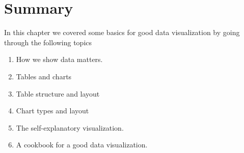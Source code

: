 \documentclass[
]{book}
\providecommand{\tightlist}{%
  \setlength{\itemsep}{0pt}\setlength{\parskip}{0pt}}
\begin{document}
\hypertarget{summary-3}{%
\section{Summary}\label{summary-3}}

In this chapter we covered some basics for good data visualization by going through the following topics

\begin{enumerate}
\def\labelenumi{\arabic{enumi}.}
\tightlist
\item
  How we show data matters.
\item
  Tables and charts
\item
  Table structure and layout
\item
  Chart types and layout
\item
  The self-explanatory visualization.
\item
  A cookbook for a good data visualization.
\end{enumerate}

  
\end{document}
